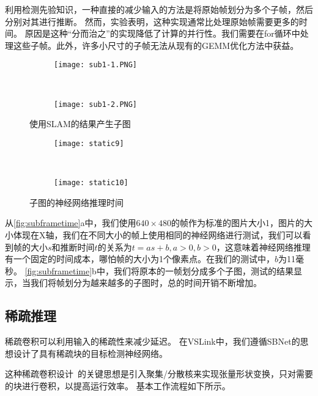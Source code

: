 利用检测先验知识，一种直接的减少输入的方法是将原始帧划分为多个子帧，然后分别对其进行推断。
然而，实验表明，这种实现通常比处理原始帧需要更多的时间。
原因是这种“分而治之”的实现降低了计算的并行性。我们需要在for循环中处理这些子帧。此外，许多小尺寸的子帧无法从现有的GEMM优化方法中获益。

\begin{figure}[htbp]
	\centering
	\begin{subfigure}{.45\linewidth}
		\texttt{[image: sub1-1.PNG]}
		\caption{}
	\end{subfigure}
	\ 
	\ 
	\ 
	\begin{subfigure}{.45\linewidth}
		\texttt{[image: sub1-2.PNG]}
		\caption{}
	\end{subfigure}
	\caption{使用SLAM的结果产生子图}\label{fig:NN for subgraph}
\end{figure}

\begin{figure}[htbp]
	\centering
	\begin{subfigure}{.48\linewidth}
		\texttt{[image: static9]}
		\caption{}
	\end{subfigure}
	\ 
	\begin{subfigure}{.48\linewidth}
		\texttt{[image: static10]}
		\caption{}
	\end{subfigure}
	\caption{子图的神经网络推理时间}\label{fig:subframetime}
\end{figure}

从\autoref{fig:subframetime}a中，我们使用$640\times 480$的帧作为标准的图片大小1，图片的大小体现在X轴，我们在不同大小的帧上使用相同的神经网络进行测试，我们可以看到帧的大小$s$和推断时间$t$的关系为$t = as + b, a>0,b >0$，这意味着神经网络推理有一个固定的时间成本，哪怕帧的大小为1个像素点。在我们的测试中，$b$为11毫秒。
\autoref{fig:subframetime}b中，我们将原本的一帧划分成多个子图，测试的结果显示，当我们将帧划分为越来越多的子图时，总的时间开销不断增加。
 
\subsection{稀疏推理}
稀疏卷积\cite{graham2015sparse,ren2018sbnet}可以利用输入的稀疏性来减少延迟。
在VSLink中，我们遵循SBNet\cite{ren2018sbnet}的思想设计了具有稀疏块的目标检测神经网络。

这种稀疏卷积设计~\cite{ren2018sbnet}的关键思想是引入聚集/分散核来实现张量形状变换，只对需要的块进行卷积，以提高运行效率。
基本工作流程如下所示。

